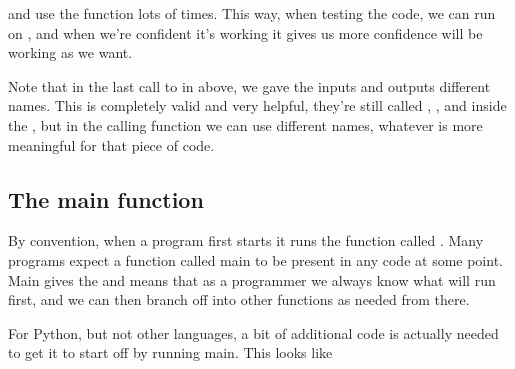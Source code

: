\documentclass[letterpaper,10pt,british]{sphinxmanual}
\begin{document}
\sphinxAtStartPar
and use the function lots of times. This way, when testing the code, we can run {\hyperref[\detokenize{chapters/software_development_tools/automated_testing:unit-testing}]{}} on , and when we’re confident it’s working it gives us more confidence  will be working as we want.

\sphinxAtStartPar
Note that in the last call to  in  above, we gave the inputs and outputs different names. This is completely valid and very helpful, they’re still called , , and  inside the , but in the calling function  we can use different names, whatever is more meaningful for that piece of code.


\subsection{The main function}
\label{\detokenize{chapters/programming_fundamentals/functions:the-main-function}}
\sphinxAtStartPar
By convention, when a program first starts it runs the function called . Many programs expect a function called main to be present in any code at some point. Main gives the  and means that as a programmer we always know what will run first, and we can then branch off into other functions as needed from there.

\sphinxAtStartPar
For Python, but not other languages, a bit of additional code is actually needed to get it to start off by running main. This looks like

\begin{sphinxVerbatim}[commandchars=\\\{\}]


   
\end{sphinxVerbatim}
\end{document}
